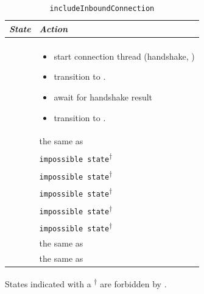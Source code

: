 \begin{table}
  \begin{tabular}[h]{ll}
    \textit{State}           & \textit{Action} \\\hline\\[2pt]
    \InitialState{}          &
      \begin{minipage}[t]{8cm}
        \begin{itemize}
          \item start connection thread (handshake, \mux{})
          \item transition to \UnnegotiatedStateIn{}.
          \item await for handshake result
          \item transition to \InboundIdleStateAny{}.
        \end{itemize}
      \end{minipage}
      \vspace{8pt}\\
    \ReservedOutboundState{} & the same as \InitialState{} \\[8pt]
    \UnnegotiatedStateAny{}  & \texttt{impossible state}\textsuperscript{$\dagger$} \\[8pt]
    \InboundIdleStateAny{}   & \texttt{impossible state}\textsuperscript{$\dagger$} \\[8pt]
    \InboundStateAny{}       & \texttt{impossible state}\textsuperscript{$\dagger$} \\[8pt]
    \OutboundStateAny{}      & \texttt{impossible state}\textsuperscript{$\dagger$} \\[8pt]
    \DuplexState{}           & \texttt{impossible state}\textsuperscript{$\dagger$} \\[8pt]
    \TerminatingState{}      & the same as \InitialState{} \\[8pt]
    \TerminatedState{}       & the same as \InitialState{} \\[8pt]
  \end{tabular}
  \caption{\texttt{includeInboundConnection}}
  \label{table:includeInboundConnection}
\end{table}
States indicated with a \textsuperscript{$\dagger$} are forbidden by \TCP{}.


